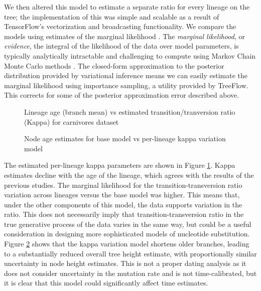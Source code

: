 We then altered this model to estimate a separate ratio for every lineage on the tree; the implementation of this was simple and scalable as a result of TensorFlow's vectorization and broadcasting functionality. We compare the models using estimates of the marginal likelihood \cite{mackay2003information}. The \textit{marginal likelihood}, or \textit{evidence}, the integral of the likelihood of the data over model parameters, is typically analytically intractable and challenging to compute using Markov Chain Monte Carlo methods \cite{xie2011improving}. The closed-form approximation to the posterior distribution provided by variational inference means we can easily estimate the marginal likelihood using importance sampling, a utility provided by TreeFlow. This corrects for some of the posterior approximation error described above.

\begin{figure}
    \centering
    \caption{Lineage age (branch mean) vs estimated transition/tranversion ratio (Kappa) for carnivores dataset}
    \label{fig:carnivoreskappa}
\end{figure}

\begin{figure}
    \centering
    \caption{Node age estimates for base model vs per-lineage kappa variation model}
    \label{fig:carnivorestree}
\end{figure}


The estimated per-lineage kappa parameters are shown in Figure \ref{fig:carnivoreskappa}. Kappa estimates decline with the age of the lineage, which agrees with the results of the previous studies. The marginal likelihood for the transition-transversion ratio variation across lineages versus the base model was higher. This means that, under the other components of this model, the data supports variation in the ratio. This does not necessarily imply that transition-transversion ratio in the true generative process of the data varies in the same way, but could be a useful consideration in designing more sophisticated models of nucleotide substitution. Figure \ref{fig:carnivorestree} shows that the kappa variation model shortens older branches, leading to a substantially reduced overall tree height estimate, with proportionally similar uncertainty in node height estimates. This is not a proper dating analysis as it does not consider uncertainty in the mutation rate and is not time-calibrated, but it is clear that this model could significantly affect time estimates.




